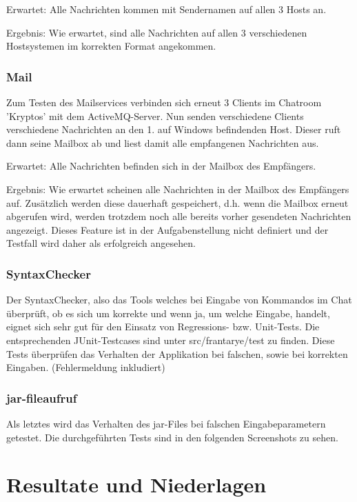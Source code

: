 \documentclass[11pt, a4paper]{article}
\begin{document}
Erwartet: Alle Nachrichten kommen mit Sendernamen auf allen 3 Hosts an.


Ergebnis: Wie erwartet, sind alle Nachrichten auf allen 3 verschiedenen Hostsystemen im korrekten Format angekommen.

\subsubsection{Mail}
Zum Testen des Mailservices verbinden sich erneut 3 Clients im Chatroom 'Kryptos' mit dem ActiveMQ-Server.
Nun senden verschiedene Clients verschiedene Nachrichten an den 1. auf Windows befindenden Host.
Dieser ruft dann seine Mailbox ab und liest damit alle empfangenen Nachrichten aus.

Erwartet: Alle Nachrichten befinden sich in der Mailbox des Empfängers.

Ergebnis: Wie erwartet scheinen alle Nachrichten in der Mailbox des Empfängers auf. Zusätzlich werden diese dauerhaft gespeichert, d.h. wenn die Mailbox erneut
abgerufen wird, werden trotzdem noch alle bereits vorher gesendeten Nachrichten angezeigt. Dieses Feature ist in der Aufgabenstellung nicht definiert und der
Testfall wird daher als erfolgreich angesehen.

\subsubsection{SyntaxChecker}
Der SyntaxChecker, also das Tools welches bei Eingabe von Kommandos im Chat überprüft, ob es sich um korrekte und wenn ja, um welche Eingabe, handelt,
eignet sich sehr gut für den Einsatz von Regressions- bzw. Unit-Tests.
Die entsprechenden JUnit-Testcases sind unter src/frantarye/test zu finden.
Diese Tests überprüfen das Verhalten der Applikation bei falschen, sowie bei korrekten Eingaben. (Fehlermeldung inkludiert)

\subsubsection{jar-fileaufruf}
Als letztes wird das Verhalten des jar-Files bei falschen Eingabeparametern getestet.
Die durchgeführten Tests sind in den folgenden Screenshots zu sehen.


\newpage

\section{Resultate und Niederlagen}
\end{document}
